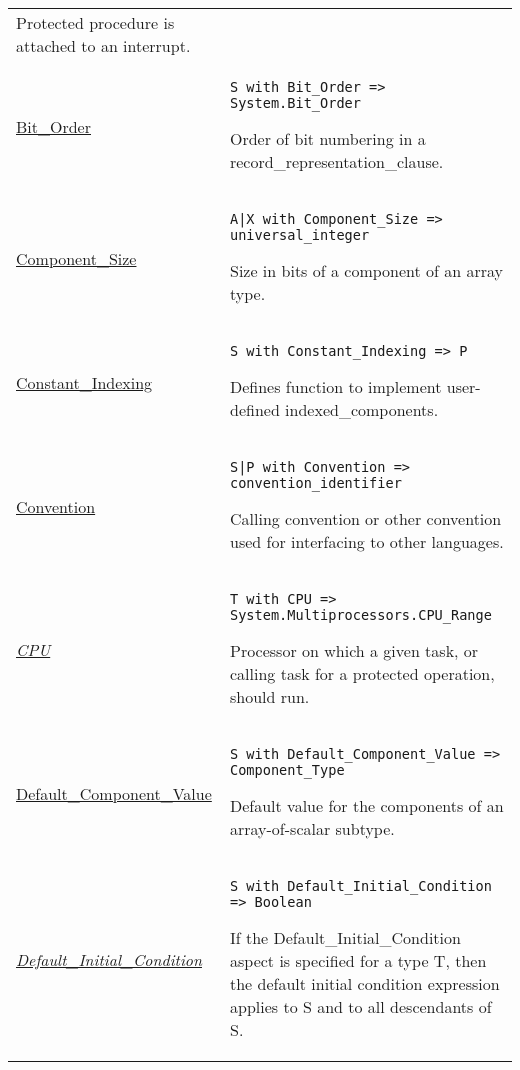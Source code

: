 \documentclass[english]{article}
\begin{document}
\begin{scriptsize}
\begin{multicols*}{3}
\begin{tabular}{@{}p{2cm}p{6.5cm}}
   Protected procedure is attached to an interrupt.\\

   \href{http://www.ada-auth.org/standards/22rm/html/RM-13-5-3.html}{Bit\_Order} & \texttt{S with Bit\_Order => System.Bit\_Order}

   Order of bit numbering in a record\_representation\_clause.\\

   \href{http://www.ada-auth.org/standards/22rm/html/RM-13-3.html}{Component\_Size} & \texttt{A|X with Component\_Size => universal\_integer}

   Size in bits of a component of an array type.\\

   \href{http://www.ada-auth.org/standards/22rm/html/RM-4-1-6.html}{Constant\_Indexing} & \texttt{S with Constant\_Indexing => P}

   Defines function to implement user-defined indexed\_components.\\

   \href{http://www.ada-auth.org/standards/22rm/html/RM-B-1.html}{Convention} & \texttt{S|P with Convention => convention\_identifier}

   Calling convention or other convention used for interfacing to other languages.\\

   \href{http://www.ada-auth.org/standards/22rm/html/RM-D-16.html}{\textit{CPU}} & \texttt{T with CPU => System.\allowbreak Multiprocessors.\allowbreak CPU\_Range}

   Processor on which a given task, or calling task for a protected operation, should run.\\

   \href{http://www.ada-auth.org/standards/22rm/html/RM-3-6.html}{Default\_Component\_Value} & \texttt{S with Default\_Component\_Value => Component\_Type}

   Default value for the components of an array-of-scalar subtype.\\

   \href{http://www.ada-auth.org/standards/22rm/html/RM-3-6.html}{\textit{Default\_Initial\_Condition}} & \texttt{S with Default\_Initial\_Condition => Boolean}

   If the Default\_Initial\_Condition aspect is specified for a type T, then the default initial condition expression applies to S and to all descendants of S.\\


\end{tabular}
\end{multicols*}
\end{scriptsize}
\end{document}
